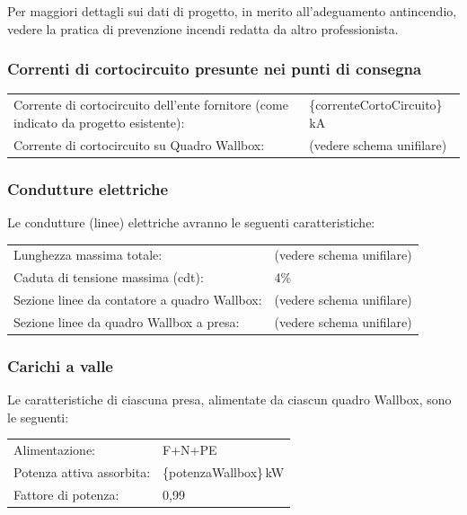 Per maggiori dettagli sui dati di progetto, in merito all’adeguamento antincendio, vedere la pratica di prevenzione incendi redatta da altro professionista.    

\subsubsection{Correnti di cortocircuito presunte nei punti di consegna }
\begin{center}
\begin{tabularx}{\textwidth}{lX}
Corrente di cortocircuito dell'ente fornitore (come indicato da progetto esistente): & \{correnteCortoCircuito\}\,kA \\
Corrente di cortocircuito su Quadro Wallbox: & (vedere schema unifilare) \\
\end{tabularx}
\end{center}


\subsubsection{Condutture elettriche}
Le condutture (linee) elettriche avranno le seguenti caratteristiche:

\begin{center}
\begin{tabularx}{\textwidth}{lX}
Lunghezza massima totale:                    & (vedere schema unifilare) \\
Caduta di tensione massima (cdt):            & 4\% \\
Sezione linee da contatore a quadro Wallbox: & (vedere schema unifilare) \\
Sezione linee da quadro Wallbox a presa:      & (vedere schema unifilare) \\
\end{tabularx}
\end{center}

\subsubsection{Carichi a valle}
Le caratteristiche di ciascuna presa, alimentate da ciascun quadro Wallbox, sono le seguenti:

\begin{center}
\begin{tabularx}{\textwidth}{lX}
Alimentazione:           & F+N+PE \\
Potenza attiva assorbita: & \{potenzaWallbox\}\,kW \\
Fattore di potenza:       & 0,99 \\
\end{tabularx}
\end{center}



